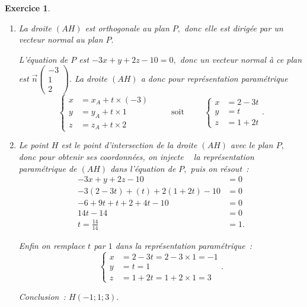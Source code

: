 \documentclass[10pt]{article}
\newtheorem{exo}{Exercice}
\begin{document}
\begin{exo}
\begin{enumerate}
\item La droite $(AH)$ est orthogonale au plan $P,$ donc elle est dirigée par un vecteur normal au plan $P.$

L'équation de $P$ est $-3x+y+2z-10=0,$ donc un vecteur normal à ce plan est $\overrightarrow{n}\begin{pmatrix}-3\\1\\2\end{pmatrix}.$ La droite $(AH)$ a donc pour représentation paramétrique \[\begin{cases}x&=x_A+t\times (-3)\\y&=y_A+t\times 1\\z&=z_A+t\times 2\end{cases}\hspace{1cm}\text{soit}\hspace{1cm}\begin{cases}x&=2-3t\\y&=t\\z&=1+2t\end{cases}.\]


\item Le point $H$ est le point d'intersection de la droite $(AH)$ avec le plan $P,$ donc pour obtenir ses coordonnées, on \og injecte \fg~{} la représentation paramétrique de $(AH)$  dans l'équation de $P,$ puis on résout~:
\begin{align*}
-3x+y+2z-10&=0\\
-3(2-3t)+(t)+2(1+2t)-10&=0\\
-6+9t+t+2+4t-10&=0\\
14t-14&=0\\
t=\frac{14}{14}&=1.
\end{align*}

Enfin on remplace $t$ par $1$ dans la représentation paramétrique~:
\[\begin{cases}x&=2-3t=2-3\times 1=-1\\y&=t=1\\z&=1+2t=1+2\times 1=3\end{cases}.\]

Conclusion~: $H(-1;1;3).$
\end{enumerate}

\end{exo}
\end{document}
